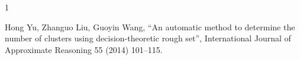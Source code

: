 \documentclass[lettersize,journal]{IEEEtran}
\begin{document}
\begin{thebibliography}{1}


Hong Yu, Zhanguo Liu, Guoyin Wang, ``An automatic method to determine the number of clusters using
decision-theoretic rough set'', International Journal of Approximate Reasoning 55 (2014) 101–115.



\end{thebibliography}


\newpage

 


\vspace{11pt}





\end{document}
